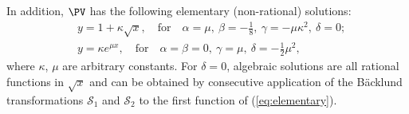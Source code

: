 In addition, $\PV$ has the following elementary (non-rational) solutions:
\begin{equation}\label{eq:elementary}
\begin{aligned}
&y=1+\kappa\sqrt{x},\quad \text{for} \quad\alpha=\mu,\ \beta=-\frac18,\ \gamma=-\mu\kappa^2,\ \delta=0;
\\
&y=\kappa e^{\mu x},\quad \text{for} \quad\alpha=\beta=0,\ \gamma=\mu,\ \delta=-\frac12\mu^2,
\end{aligned}
\end{equation}
where $\kappa$, $\mu$ are arbitrary constants.
For $\delta=0$, algebraic solutions are all rational functions in $\sqrt{x}$ and can be obtained by consecutive application of the B\"acklund transformations $\mathcal{S}_1$ and $\mathcal{S}_2$ to the first function of (\ref{eq:elementary}).


